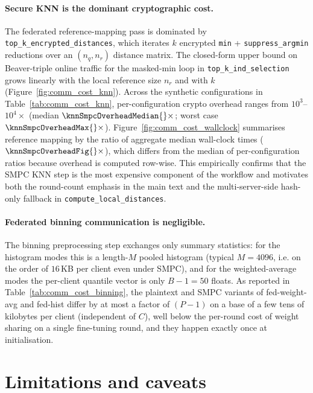 \documentclass{article}
\begin{document}
\paragraph{Secure KNN is the dominant cryptographic cost.} The
federated reference-mapping pass is dominated by
\texttt{top\_k\_encrypted\_distances}, which iterates
$k$ encrypted \texttt{min} + \texttt{suppress\_argmin} reductions over
an $(n_q, n_r)$ distance matrix. The closed-form upper bound on Beaver-triple online traffic for the
masked-min loop in \texttt{top\_k\_ind\_selection} grows linearly with
the local reference size $n_r$ and with $k$
(Figure~\ref{fig:comm_cost_knn}). Across the synthetic
configurations in Table~\ref{tab:comm_cost_knn}, per-configuration crypto
overhead ranges from $10^3$--$10^4\times$ (median
$\knnSmpcOverheadMedian{}\times$; worst case
$\knnSmpcOverheadMax{}\times$). Figure~\ref{fig:comm_cost_wallclock}
summarises reference mapping by the ratio of aggregate median wall-clock
times ($\knnSmpcOverheadFig{}\times$), which differs from the median of
per-configuration ratios because overhead is computed row-wise. This
empirically confirms that the SMPC KNN step is the most expensive
component of the workflow and motivates both the round-count emphasis
in the main text and the multi-server-side hash-only fallback in
\texttt{compute\_local\_distances}.

\paragraph{Federated binning communication is negligible.} The binning
preprocessing step exchanges only summary statistics: for the
histogram modes this is a length-$M$ pooled histogram (typical
$M = 4096$, i.e. on the order of $16$\,KB per client even under SMPC),
and for the weighted-average modes the per-client quantile vector is
only $B-1 = 50$ floats. As reported in
Table~\ref{tab:comm_cost_binning}, the plaintext and SMPC variants of
fed-weight-avg and fed-hist differ by at most a factor of
$(P-1)$ on a base of a few tens of
kilobytes per client (independent of $C$), well below the per-round
cost of weight sharing on a single fine-tuning round, and they happen
exactly once at initialisation.

\section*{Limitations and caveats}
\end{document}
